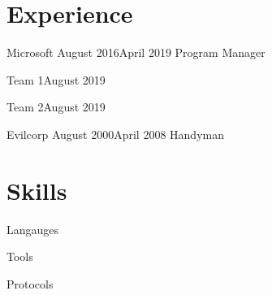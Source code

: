 \documentclass[]{../resume}
\author{Caleb Thorsteinson}
\begin{document}

\section{Experience}

\begin{employer}{Microsoft} {August 2016}{April 2019} {Program Manager}
  \begin{teams}
    \begin{team}{Team 1}{August 2019}
        \lipsum[1]
    \end{team}
    \begin{team}{Team 2}{August 2019}
        \lipsum[2]
    \end{team}
  \end{teams}
\end{employer}

\begin{employer}{Evilcorp} {August 2000}{April 2008} {Handyman}
  \lipsum[5]
\end{employer}

\newcolumn


\section{Skills}

\begin{skilltable}{Langauges}
\end{skilltable}

\begin{skilltable}{Tools}
\end{skilltable}

\begin{skilltable}{Protocols}
\end{skilltable}
    
\end{document}
